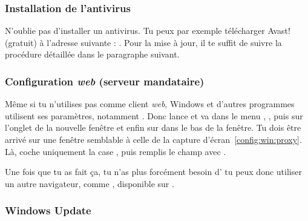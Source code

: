 


\subsubsection{Installation de l'antivirus}
\label{antivirus} 

N'oublie pas d'installer un antivirus. Tu peux par exemple télécharger Avast! (gratuit) à l'adresse suivante : . Pour la mise à jour, il te suffit de suivre la procédure détaillée dans le paragraphe suivant.

\subsubsection{Configuration \emph{web} (serveur mandataire)}


M\^eme si tu n'utilises pas  comme client \emph{web}, Windows et d'autres programmes
utilisent ses param\`etres, notamment . Donc lance  et va
dans le menu , , puis sur l'onglet  de la
nouvelle fen\^etre et enfin sur  dans le bas de la fen\^etre. Tu dois \^etre arriv\'e sur une fen\^etre semblable \`a celle de la capture d'\'ecran~\ref{config:win:proxy}. L\`a, coche
uniquement la case , puis remplis le champ
 avec .

Une fois que tu as fait \c{c}a, tu n'as plus forc\'ement besoin d' tu peux donc utiliser un autre navigateur, comme , disponible sur .




\subsubsection{Windows Update}


